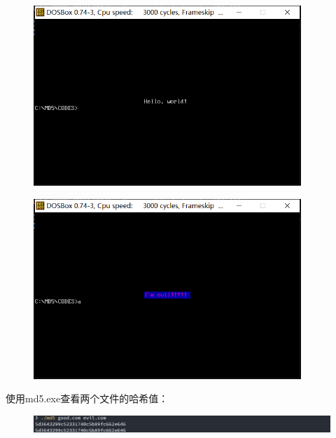 \documentclass[UTF8, a4paper, 11pt]{article}
\begin{document}
\begin{figure}[H]
    \centering
    \includegraphics[width = 0.9\textwidth]{good.png}
\end{figure}
\begin{figure}[H]
    \centering
    \includegraphics[width = 0.9\textwidth]{evil.png}
\end{figure}
使用md5.exe查看两个文件的哈希值：
\begin{figure}[H]
    \centering
    \includegraphics[width = \textwidth]{md5.png}
\end{figure}
\end{document}
